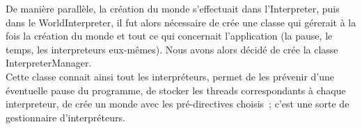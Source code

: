 De manière parallèle, la création du monde s'effectuait dans l'Interpreter, puis dans le WorldInterpreter, il fut alors nécessaire de crée une classe qui gérerait à la fois la création du monde et tout ce qui concernait l'application (la pause, le temps, les interpreteurs eux-mêmes). Nous avons alors décidé de crée la classe InterpreterManager.\\
Cette classe connait ainsi tout les interpréteurs, permet de les prévenir d'une éventuelle pause du programme, de stocker les threads correspondants à chaque interpreteur, de crée un monde avec les pré-directives choisis~; c'est une sorte de gestionnaire d'interpréteurs.
